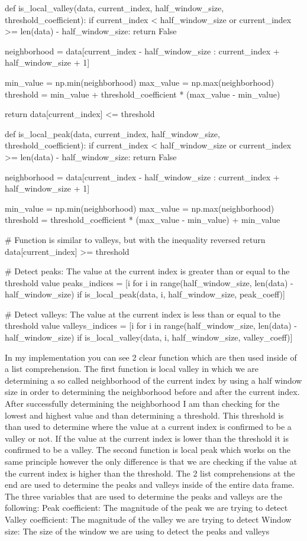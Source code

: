 \documentclass{imc-inf}
\begin{document}
	\begin{code}[language=Python, caption={Rolling Windows Implementation}]
		def is_local_valley(data, current_index, half_window_size, threshold_coefficient):
			if current_index < half_window_size or current_index >= len(data) - half_window_size:
				return False

			neighborhood = data[current_index - half_window_size : current_index + half_window_size + 1]

			min_value = np.min(neighborhood)
			max_value = np.max(neighborhood)
			threshold = min_value + threshold_coefficient * (max_value - min_value)

			return data[current_index] <= threshold

		def is_local_peak(data, current_index, half_window_size, threshold_coefficient):
			if current_index < half_window_size or current_index >= len(data) - half_window_size:
				return False

			neighborhood = data[current_index - half_window_size : current_index + half_window_size + 1]

			min_value = np.min(neighborhood)
			max_value = np.max(neighborhood)
			threshold = threshold_coefficient * (max_value - min_value) + min_value

			# Function is similar to valleys, but with the inequality reversed
			return data[current_index] >= threshold


		# Detect peaks: The value at the current index is greater than or equal to the threshold value
		peaks_indices = [i for i in range(half_window_size, len(data) - half_window_size) if is_local_peak(data, i, half_window_size, peak_coeff)]

		# Detect valleys: The value at the current index is less than or equal to the threshold value
		valleys_indices = [i for i in range(half_window_size, len(data) - half_window_size) if is_local_valley(data, i, half_window_size, valley_coeff)]
	\end{code}
	
	
	In my implementation you can see 2 clear function which are then used inside of a list comprehension. The first function is local valley in which 
	we are determining a so called neighborhood of the current index by using a half window size in order to determining the neighborhood before and after the current index.
	After successfully determining the neighborhood I am than checking for the lowest and highest value and than determining a threshold. This threshold is than used to determine
	where the value at a current index is confirmed to be a valley or not. If the value at the current index is lower than the threshold it is confirmed to be a valley.
	The second function is local peak which works on the same principle however the only difference is that we are checking if the value at the current index is higher than the threshold.
	The 2 list comprehensions at the end are used to determine the peaks and valleys inside of the entire data frame.
	The three variables that are used to determine the peaks and valleys are the following:
	Peak coefficient: The magnitude of the peak we are trying to detect
	Valley coefficient: The magnitude of the valley we are trying to detect
	Window size: The size of the window we are using to detect the peaks and valleys
	
\end{document}
